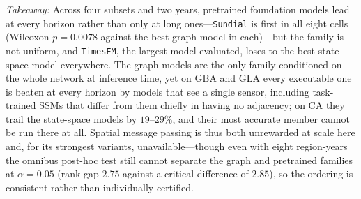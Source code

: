 \begin{insightbox}
\textit{Takeaway:} Across four subsets and two years, pretrained foundation
models lead at every horizon rather than only at long ones---\texttt{Sundial} is
first in all eight cells (Wilcoxon $p = 0.0078$ against the best graph model in
each)---but the family is not uniform, and \texttt{TimesFM}, the largest model
evaluated, loses to the best state-space model everywhere. The graph models are
the only family conditioned on the whole network at inference time, yet on GBA
and GLA every executable one is beaten at every horizon by models that see a
single sensor, including task-trained SSMs that differ from them chiefly in
having no adjacency; on CA they trail the state-space models by $19$--$29\%$,
and their most accurate member cannot be run there at all. Spatial message passing is thus both
unrewarded at scale here and, for its strongest variants, unavailable---though
even with eight region-years the omnibus post-hoc test still cannot separate the
graph and pretrained families at $\alpha = 0.05$ (rank gap $2.75$ against a
critical difference of $2.85$), so the ordering is consistent rather than
individually certified.
\end{insightbox}
